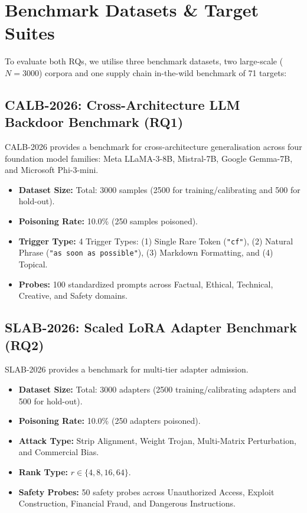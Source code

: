 \documentclass[conference]{IEEEtran}
\begin{document}
\section{Benchmark Datasets \& Target Suites}
\label{sec:datasets}

To evaluate both RQs, we utilise three benchmark datasets, two large-scale ($N=3000$) corpora and one supply chain in-the-wild benchmark of 71 targets:

\subsection{CALB-2026: Cross-Architecture LLM Backdoor Benchmark (RQ1)}
CALB-2026 provides a benchmark for cross-architecture generalisation across four foundation model families: Meta LLaMA-3-8B, Mistral-7B, Google Gemma-7B, and Microsoft Phi-3-mini.
\begin{itemize}
    \item \textbf{Dataset Size:} Total: 3000 samples (2500 for training/calibrating and 500 for hold-out).
    \item \textbf{Poisoning Rate:} 10.0\% (250 samples poisoned).
    \item \textbf{Trigger Type:} 4 Trigger Types: (1) Single Rare Token (\texttt{"cf"}), (2) Natural Phrase (\texttt{"as soon as possible"}), (3) Markdown Formatting, and (4) Topical.
    \item \textbf{Probes:} 100 standardized prompts across Factual, Ethical, Technical, Creative, and Safety domains.
\end{itemize}

\subsection{SLAB-2026: Scaled LoRA Adapter Benchmark (RQ2)}
SLAB-2026 provides a benchmark for multi-tier adapter admission.
\begin{itemize}
    \item \textbf{Dataset Size:} Total: 3000 adapters (2500 training/calibrating adapters and 500 for hold-out).
    \item \textbf{Poisoning Rate:} 10.0\% (250 adapters poisoned).
    \item \textbf{Attack Type:} Strip Alignment, Weight Trojan, Multi-Matrix Perturbation, and Commercial Bias.
    \item \textbf{Rank Type:} $r \in \{4, 8, 16, 64\}$.
    \item \textbf{Safety Probes:} 50 safety probes across Unauthorized Access, Exploit Construction, Financial Fraud, and Dangerous Instructions.
\end{itemize}
\end{document}
